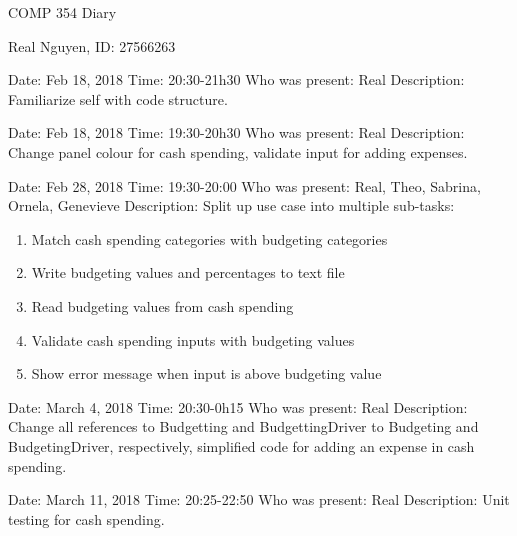 \documentclass{article}
\begin{document}
 
\begin{center}
    COMP 354 Diary
\end{center}
 
\begin{center}
    Real Nguyen, ID: 27566263
\end{center}
 
\begin{flushleft}
Date: Feb 18, 2018 \newline
Time: 20:30-21h30 \newline
Who was present: Real\newline
Description: Familiarize self with code structure.\newline
\end{flushleft}
 
\begin{flushleft}
Date: Feb 18, 2018 \newline
Time: 19:30-20h30 \newline
Who was present: Real\newline
Description: Change panel colour for cash spending, validate input for adding expenses.\newline
\end{flushleft}
 
\begin{flushleft}
Date: Feb 28, 2018 \newline
Time: 19:30-20:00 \newline
Who was present: Real, Theo, Sabrina, Ornela, Genevieve\newline
Description: Split up use case into multiple sub-tasks:
\begin{enumerate}
  \item Match cash spending categories with budgeting categories
  \item Write budgeting values and percentages to text file
  \item Read budgeting values from cash spending
  \item Validate cash spending inputs with budgeting values
  \item Show error message when input is above budgeting value
\end{enumerate}
\end{flushleft}

\begin{flushleft}
Date: March 4, 2018 \newline
Time: 20:30-0h15 \newline
Who was present: Real\newline
Description: Change all references to Budgetting and BudgettingDriver to Budgeting and BudgetingDriver, respectively, simplified code for adding an expense in cash spending.\newline
\end{flushleft}

\begin{flushleft}
Date: March 11, 2018 \newline
Time: 20:25-22:50 \newline
Who was present: Real\newline
Description: Unit testing for cash spending.\newline
\end{flushleft}
 
\end{document}
